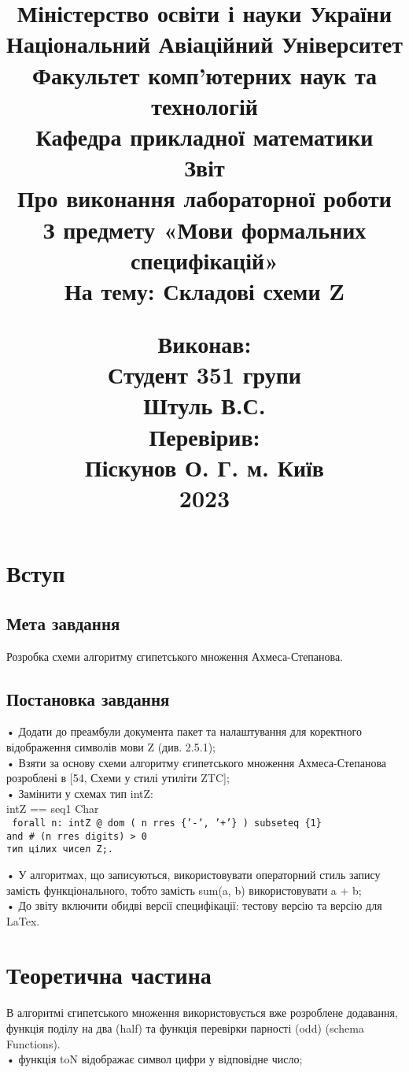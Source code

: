 \documentclass {report}
\title{
\textbf{Міністерство освіти і науки України \\ 
Національний Авіаційний Університет \\
Факультет комп’ютерних наук та технологій\\}
\vspace{0.5cm}
\large 
\raggedleft
\textbf{Кафедра прикладної математики \\}
\vspace{1cm}
\center
\huge
\textbf{Звіт\\
\Large Про виконання лабораторної роботи \\
З предмету «Мови формальних специфікацій» \\
На тему: Складові схеми Z \\}
\vspace{0.3cm}
\raggedleft

\Large Виконав: \\
Студент 351 групи \\
Штуль В.С. \\
Перевірив:\\
Піскунов О. Г.
\center
\vspace{1cm}
м. Київ\\
2023
}
\date{}
\begin{document}
\maketitle
\titlepage
\tableofcontents
\newpage
\chapter{Вступ}

\section {Мета завдання}
Розробка схеми алгоритму єгипетського множення Ахмеса-Степанова.
\section {Постановка завдання}
• Додати до преамбули документа пакет та налаштування для коректного відображення символів мови Z (див. 2.5.1);\\

• Взяти за основу схеми алгоритму єгипетського множення Ахмеса-Степанова розроблені в [54, Схеми у стилі утиліти ZTC];\\

• Замінити у схемах тип intZ:\\
intZ == seq1 Char\\
\texttt{
forall n: intZ @ dom ( n rres \{'-', '+'\} ) subseteq \{1\}\\
and \# (n rres digits) > 0\\
тип цілих чисел Z;.\\}

• У алгоритмах, що записуються, використовувати операторний стиль запису замість функціонального, тобто замість sum(a, b) використовувати a + b;\\

• До звіту включити обидві версії специфікації: тестову версію та версію для LaTex.\cite{author1}\\

\chapter{Теоретична частина}

В алгоритмі єгипетського множення використовується вже розроблене додавання, функція поділу на два (half) та функція перевірки парності (odd) (schema Functions).\\

• функція toN відображає символ цифри у відповідне число;\\
\end{document}
